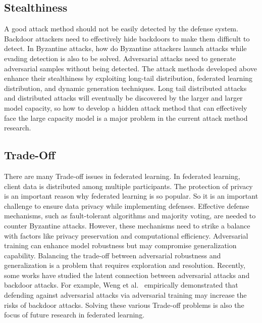 \documentclass[pdflatex,sn-mathphys-num]{sn-jnl}%
\theoremstyle{thmstyleone}%
\theoremstyle{thmstyletwo}%
\theoremstyle{thmstylethree}%
\begin{document}
    \subsection{Stealthiness}
    
    A good attack method should not be easily detected by
    the defense system. Backdoor attackers need to effectively
    hide backdoors to make them diﬀicult to detect. In
    Byzantine attacks, how do Byzantine attackers launch
    attacks while evading detection is also to be solved.
    Adversarial attacks need to generate adversarial samples
    without being detected. The attack methods developed
    above enhance their stealthiness by exploiting long-tail
    distribution, federated learning distribution, and dynamic
    generation techniques. Long tail distributed attacks and
    distributed attacks will eventually be discovered by the
    larger and larger model capacity, so how to develop a
    hidden attack method that can effectively face the large
    capacity model is a major problem in the current attack
    method research.   
    
    \subsection{Trade-Off}
    There are many Trade-off issues in federated learning.
    In federated learning, client data is distributed among
    multiple participants. The protection of privacy is an
    important reason why federated learning is so popular.
    So it is an important challenge to ensure data privacy
    while implementing defenses. Effective defense
    mechanisms, such as fault-tolerant algorithms and majority
    voting, are needed to counter Byzantine attacks. However,
    these mechanisms need to strike a balance with factors
    like privacy preservation and computational eﬀiciency.
    Adversarial training can enhance model robustness but
    may compromise generalization capability. Balancing the
    trade-off between adversarial robustness and
    generalization is a problem that requires exploration and resolution.
    Recently, some works have studied the latent connection
    between adversarial attacks and backdoor attacks. For
    example, Weng et al.~\cite{weng2020trade} empirically demonstrated that
    defending against adversarial attacks via adversarial
    training may increase the risks of backdoor attacks. Solving
    these various Trade-off problems is also the focus of future
    research in federated learning.
    
\end{document}

